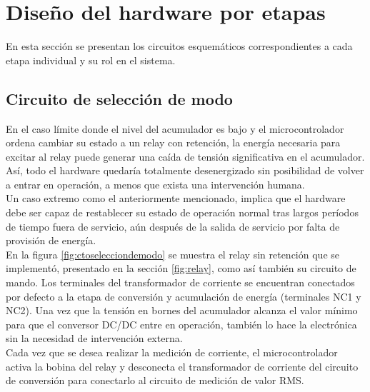 \section{Diseño del hardware por etapas}\label{seccion_hardware}
En esta sección se presentan los circuitos esquemáticos correspondientes a cada etapa individual y su rol en el sistema.
\subsection{Circuito de selección de modo}
En el caso límite donde el nivel del acumulador es bajo y el microcontrolador ordena cambiar su estado a un relay con retención, la energía necesaria para excitar al relay puede generar una caída de tensión significativa en el acumulador. As\'{i}, todo el hardware quedaría totalmente desenergizado sin posibilidad de volver a entrar en operación, a menos que exista una intervención humana.\\
Un caso extremo como el anteriormente mencionado, implica que el hardware debe ser capaz de restablecer su estado de operación normal tras largos períodos de tiempo fuera de servicio, aún después de la salida de servicio por falta de provisión de energía.\\
En la figura \ref{fig:ctoselecciondemodo} se muestra el relay sin retención que se implementó,  presentado en la secci\'{o}n \ref{fig:relay}, como as\'{i} tambi\'{e}n su circuito de mando. Los terminales del transformador de corriente se encuentran conectados por defecto a la etapa de conversión y acumulación de energía (terminales NC1 y NC2). Una vez que la tensión en bornes del acumulador alcanza el valor mínimo para que el conversor DC/DC entre en operación, también lo hace la electrónica sin la necesidad de intervención externa.\\
Cada vez que se desea realizar la medición de corriente, el microcontrolador activa la bobina del relay y desconecta el transformador de corriente del circuito de conversi\'{o}n para conectarlo al circuito de medición de valor RMS.\\
